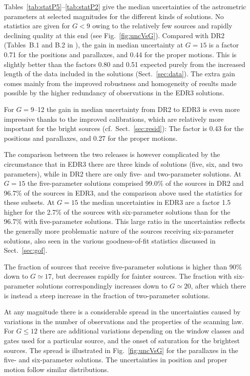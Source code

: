 \documentclass[longauth]{aa} %
\begin{document}
Tables~\ref{tab:statP5}--\ref{tab:statP2} give the median uncertainties of the
astrometric parameters at selected magnitudes for the different kinds of solutions. 
No statistics are given for $G<9$ owing to the relatively few sources and rapidly 
declining quality at this end (see Fig.~\ref{fig:uncVsG}).
Compared with DR2 (Tables~B.1 and B.2 in ), the gain 
in median uncertainty at $G=15$ is a factor 0.71 for the positions and parallaxes,
and 0.44 for the proper motions. This is slightly better than the factors 0.80 and 0.51
expected purely from the increased length of the data included in the solutions
(Sect.~\ref{sec:data}). The extra gain comes mainly from the improved robustness 
and homogeneity of results made possible by the higher redundancy of observations 
in the EDR3 solutions. 

For $G=9$--12 the gain in median uncertainty from DR2 to EDR3 is even more 
impressive thanks to the improved calibrations, which are relatively more important 
for the bright sources (cf.\  Sect.~\ref{sec:resid}): The factor is 0.43 for the positions 
and parallaxes, and 0.27 for the proper motions.

The comparison between the two releases is however complicated by the circumstance 
that in EDR3 there are three kinds of solutions (five, six, and two parameters), while 
in DR2 there are only five- and two-parameter solutions. At $G=15$ the five-parameter 
solutions comprised 99.0\% of the sources in DR2 and 96.7\% of the sources in EDR3, 
and the comparison above used the statistics for these subsets. At $G=15$ the median 
uncertainties in EDR3 are a factor 1.5 higher for the 2.7\% of the sources with 
six-parameter solutions than for the 96.7\% with five-parameter solutions. This
large ratio in the uncertainties reflects the generally more problematic nature 
of the sources receiving six-parameter solutions, also seen in the various
goodness-of-fit statistics discussed in Sect.~\ref{sec:gof}.

The fraction of sources that receive five-parameter solutions is higher than 90\%
down to $G\simeq 17$, but decreases rapidly for fainter sources. The fraction with
six-parameter solutions correspondingly increases down to $G\simeq 20$, after 
which there is instead a steep increase in the fraction of two-parameter solutions. 

At any magnitude there is a considerable spread in the uncertainties caused by
variations in the number of observations and the properties of the scanning law. For 
$G\le 12$ there are additional variations depending on the window classes and gates 
used for a particular source, and the onset of saturation for
the brightest sources. The spread is illustrated in Fig.~\ref{fig:uncVsG} 
for the parallaxes in the five- and six-parameter solutions. The uncertainties in position
and proper motion follow similar distributions. 
\end{document}
